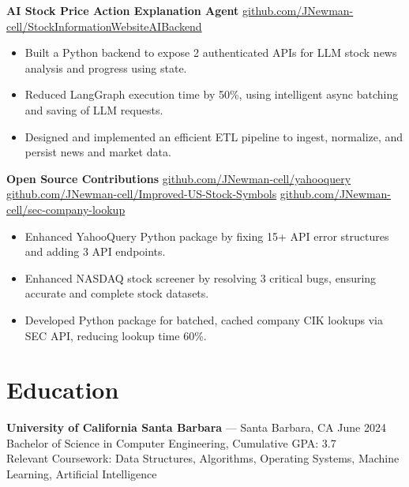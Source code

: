 \documentclass[letterpaper,11pt]{article}
\begin{document}
\textbf{AI Stock Price Action Explanation Agent}
\href{https://github.com/JNewman-cell/StockInformationWebsiteAIBackend}{github.com/JNewman-cell/StockInformationWebsiteAIBackend}

\begin{itemize}[leftmargin=*, itemsep=2pt, parsep=0pt, topsep=2pt]
    \item Built a Python backend to expose 2 authenticated APIs for LLM stock news analysis and progress using state. 
    \item Reduced LangGraph execution time by 50\%, using intelligent async batching and saving of LLM requests.
    \item Designed and implemented an efficient ETL pipeline to ingest, normalize, and persist news and market data.
\end{itemize}

\textbf{Open Source Contributions}
\href{https://github.com/JNewman-cell/yahooquery}{github.com/JNewman-cell/yahooquery}
\href{https://github.com/JNewman-cell/Improved-US-Stock-Symbols}{github.com/JNewman-cell/Improved-US-Stock-Symbols}
\href{https://github.com/JNewman-cell/sec-company-lookup}{github.com/JNewman-cell/sec-company-lookup}

\begin{itemize}[leftmargin=*, itemsep=2pt, parsep=0pt, topsep=2pt]
    \item Enhanced YahooQuery Python package by fixing 15+ API error structures and adding 3 API endpoints.
    \item Enhanced NASDAQ stock screener by resolving 3 critical bugs, ensuring accurate and complete stock datasets.
    \item Developed Python package for batched, cached company CIK lookups via SEC API, reducing lookup time 60\%.
\end{itemize}

\section{Education}

\textbf{University of California Santa Barbara} — Santa Barbara, CA \hfill June 2024 
\\ Bachelor of Science in Computer Engineering, Cumulative GPA: 3.7 \\
Relevant Coursework: Data Structures, Algorithms, Operating Systems, Machine Learning, Artificial Intelligence
\end{document}
